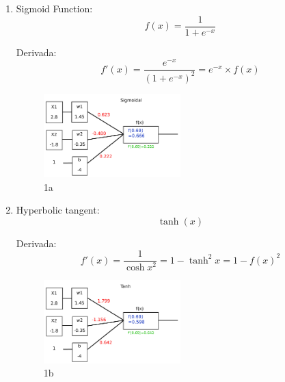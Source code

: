 \begin{enumerate}[label=(\alph*)]
    \item Sigmoid Function:
    \[
        f(x) = \frac{1}{1 + e^{-x}}
        \]
    
    Derivada:
    \[
        f'(x) = \frac{e^{-x}}{(1 + e^{-x})^2} =  e^{-x}\times f(x)
        \]

        \begin{figure}[H]
            \begin{small}
                \begin{center}
                    \includegraphics[width=0.5\textwidth]{Graphs/ejer1a.pdf}
                \end{center}
                \caption{1a}
                \label{fig:1a}
            \end{small}
        \end{figure}
        

    \item Hyperbolic tangent:
    \[  \tanh(x)
        \]

    Derivada:
    \[
        f'(x) =  \frac{1}{\cosh{x}^2} = 1 - \tanh^2x = 1 - f(x)^2
        \]

        \begin{figure}[H]
            \begin{small}
                \begin{center}
                    \includegraphics[width=0.5\textwidth]{Graphs/ejer1b.pdf}
                \end{center}
                \caption{1b}
                \label{fig:1b}
            \end{small}
        \end{figure}
        


\end{enumerate}
